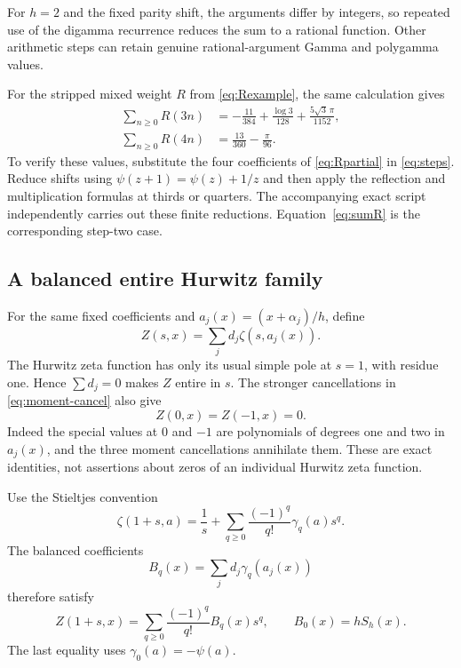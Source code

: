 \documentclass[11pt,letterpaper]{article}
\numberwithin{equation}{section}
\theoremstyle{plain}
\theoremstyle{definition}
\theoremstyle{remark}
\begin{document}
For $h=2$ and the fixed parity shift, the arguments differ by integers, so repeated use of the digamma recurrence reduces the sum to a rational function. Other arithmetic steps can retain genuine rational-argument Gamma and polygamma values.

For the stripped mixed weight $R$ from \eqref{eq:Rexample}, the same calculation gives
\begin{align}
 \sum_{n\ge0}R(3n)&=-\frac{11}{384}+\frac{\log3}{128}
                         +\frac{5\sqrt3\,\pi}{1152},\label{eq:Rstep3}\\
 \sum_{n\ge0}R(4n)&=\frac{13}{360}-\frac{\pi}{96}.\label{eq:Rstep4}
\end{align}
To verify these values, substitute the four coefficients of \eqref{eq:Rpartial} in \eqref{eq:steps}. Reduce shifts using $\psi(z+1)=\psi(z)+1/z$ and then apply the reflection and multiplication formulas at thirds or quarters. The accompanying exact script independently carries out these finite reductions. Equation~\eqref{eq:sumR} is the corresponding step-two case.

\subsection{A balanced entire Hurwitz family}

For the same fixed coefficients and $a_j(x)=(x+\alpha_j)/h$, define
\begin{equation}\label{eq:Zbalanced}
 Z(s,x)=\sum_jd_j\zeta(s,a_j(x)).
\end{equation}
The Hurwitz zeta function has only its usual simple pole at $s=1$, with residue one. Hence $\sum d_j=0$ makes $Z$ entire in $s$. The stronger cancellations in \eqref{eq:moment-cancel} also give
\begin{equation}\label{eq:Zzeros}
 Z(0,x)=Z(-1,x)=0.
\end{equation}
Indeed the special values at $0$ and $-1$ are polynomials of degrees one and two in $a_j(x)$, and the three moment cancellations annihilate them. These are exact identities, not assertions about zeros of an individual Hurwitz zeta function.

Use the Stieltjes convention
\begin{equation}\label{eq:stieltjes}
 \zeta(1+s,a)=\frac1s+\sum_{q\ge0}\frac{(-1)^q}{q!}\gamma_q(a)s^q.
\end{equation}
The balanced coefficients
\[
 B_q(x)=\sum_jd_j\gamma_q(a_j(x))
\]
therefore satisfy
\begin{equation}\label{eq:balanced-Laurent}
 Z(1+s,x)=\sum_{q\ge0}\frac{(-1)^q}{q!}B_q(x)s^q,
 \qquad B_0(x)=hS_h(x).
\end{equation}
The last equality uses $\gamma_0(a)=-\psi(a)$.
\end{document}

